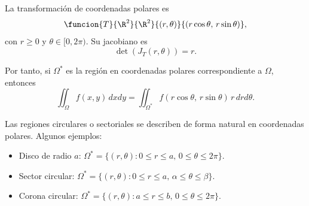 \documentclass[a4,11pt]{aleph-notas}
\begin{document}
La transformación de coordenadas polares es
\[
    \funcion{T}{\R^2}{\R^2}{(r,\theta)}{(r\cos\theta,\, r\sin\theta)},
\]
con $r\geq 0$ y $\theta\in[0,2\pi)$. Su jacobiano es
\[
    \det(J_T(r,\theta)) = r.
\]

Por tanto, si $\Omega^*$ es la región en coordenadas polares correspondiente a $\Omega$, entonces
\[
    \iint_\Omega f(x,y)\, dxdy = \iint_{\Omega^*} f(r\cos\theta,\, r\sin\theta)\, r\, drd\theta.
\]

\begin{advertencia}
    Las regiones circulares o sectoriales se describen de forma natural en coordenadas polares. Algunos ejemplos:
    \begin{itemize}
        \item Disco de radio $a$: $\Omega^*=\{(r,\theta):0\leq r\leq a,\, 0\leq\theta\leq 2\pi\}$.
        \item Sector circular: $\Omega^*=\{(r,\theta):0\leq r\leq a,\, \alpha\leq\theta\leq\beta\}$.
        \item Corona circular: $\Omega^*=\{(r,\theta):a\leq r\leq b,\, 0\leq\theta\leq 2\pi\}$.
    \end{itemize}
\end{advertencia}
\end{document}
